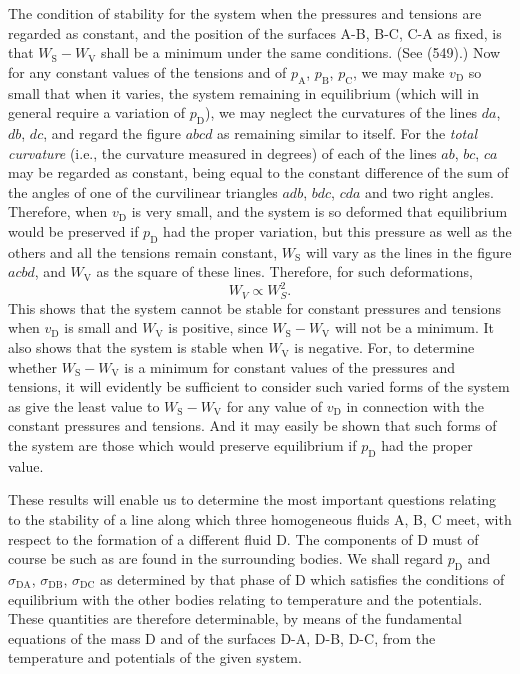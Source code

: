 \documentclass[12pt]{memoir}
\begin{document}
The condition of stability for the system when the pressures and tensions are regarded as constant, and the position of the surfaces A-B, B-C, C-A as fixed, is that $W_\text{S} - W_\text{V}$ shall be a minimum under the same conditions. (See (549).) Now for any constant values of the tensions and of $p_\text{A}$, $p_\text{B}$, $p_\text{C}$, we may make $v_\text{D}$ so small that when it varies, the system remaining in equilibrium (which will in general require a variation of $p_\text{D}$), we may neglect the curvatures of the lines $da$, $db$, $dc$, and regard the figure $abcd$ as remaining similar to itself. For the \textit{total curvature} (i.e., the curvature measured in degrees) of each of the lines $ab$, $bc$, $ca$ may be regarded as constant, being equal to the constant difference of the sum of the angles of one of the curvilinear triangles $adb$, $bdc$, $cda$ and two right angles. Therefore, when $v_\text{D}$ is very small, and the system is so deformed that equilibrium would be preserved if $p_\text{D}$ had the proper variation, but this pressure as well as the others and all the tensions remain constant, $W_\text{S}$ will vary as the lines in the figure $acbd$, and $W_\text{V}$ as the square of these lines. Therefore, for such deformations,
$$ W_V \propto W_S^2. $$
This shows that the system cannot be stable for constant pressures and tensions when $v_\text{D}$ is small and $W_\text{V}$ is positive, since $W_\text{S}-W_\text{V}$ will not be a minimum. It also shows that the system is stable when $W_\text{V}$ is negative. For, to determine whether $W_\text{S}-W_\text{V}$ is a minimum for constant values of the pressures and tensions, it will evidently be sufficient to consider such varied forms of the system as give the least value to $W_\text{S}-W_\text{V}$ for any value of $v_\text{D}$ in connection with the constant pressures and tensions. And it may easily be shown that such forms of the system are those which would preserve equilibrium if $p_\text{D}$ had the proper value.

These results will enable us to determine the most important questions relating to the stability of a line along which three homogeneous fluids A, B, C meet, with respect to the formation of a different fluid D. The components of D must of course be such as are found in the surrounding bodies. We shall regard $p_\text{D}$ and $\sigma_{\text{DA}}$, $\sigma_{\text{DB}}$, $\sigma_{\text{DC}}$ as determined by that phase of D which satisfies the conditions of equilibrium with the other bodies relating to temperature and the potentials. These quantities are therefore determinable, by means of the fundamental equations of the mass D and of the surfaces D-A, D-B, D-C, from the temperature and potentials of the given system.
\end{document}
